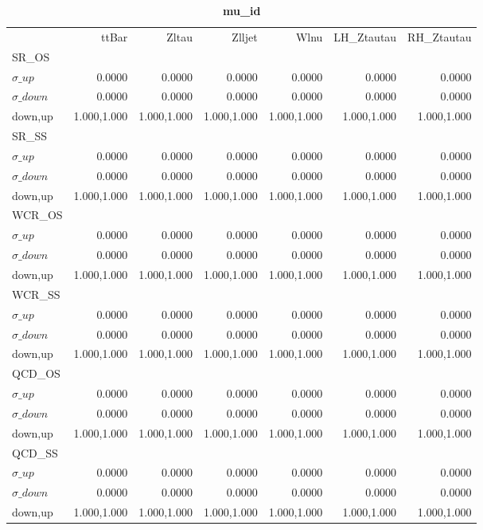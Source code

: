 \documentclass[11pt,oneside,a4paper]{article}
\begin{document}
\begin{table}
\centering
\caption{\bf{mu\_id}}
\begin{tabular}{lrrrrrr}
 & ttBar & Zltau & Zlljet & Wlnu & LH\_Ztautau & RH\_Ztautau \\
SR\_OS &  &  &  &  &  &  \\
$\sigma\_up$ & 0.0000 & 0.0000 & 0.0000 & 0.0000 & 0.0000 & 0.0000 \\
$\sigma\_down$ & 0.0000 & 0.0000 & 0.0000 & 0.0000 & 0.0000 & 0.0000 \\
down,up & 1.000,1.000 & 1.000,1.000 & 1.000,1.000 & 1.000,1.000 & 1.000,1.000 & 1.000,1.000 \\

\hline
SR\_SS &  &  &  &  &  &  \\
$\sigma\_up$ & 0.0000 & 0.0000 & 0.0000 & 0.0000 & 0.0000 & 0.0000 \\
$\sigma\_down$ & 0.0000 & 0.0000 & 0.0000 & 0.0000 & 0.0000 & 0.0000 \\
down,up & 1.000,1.000 & 1.000,1.000 & 1.000,1.000 & 1.000,1.000 & 1.000,1.000 & 1.000,1.000 \\

\hline
WCR\_OS &  &  &  &  &  &  \\
$\sigma\_up$ & 0.0000 & 0.0000 & 0.0000 & 0.0000 & 0.0000 & 0.0000 \\
$\sigma\_down$ & 0.0000 & 0.0000 & 0.0000 & 0.0000 & 0.0000 & 0.0000 \\
down,up & 1.000,1.000 & 1.000,1.000 & 1.000,1.000 & 1.000,1.000 & 1.000,1.000 & 1.000,1.000 \\

\hline
WCR\_SS &  &  &  &  &  &  \\
$\sigma\_up$ & 0.0000 & 0.0000 & 0.0000 & 0.0000 & 0.0000 & 0.0000 \\
$\sigma\_down$ & 0.0000 & 0.0000 & 0.0000 & 0.0000 & 0.0000 & 0.0000 \\
down,up & 1.000,1.000 & 1.000,1.000 & 1.000,1.000 & 1.000,1.000 & 1.000,1.000 & 1.000,1.000 \\

\hline
QCD\_OS &  &  &  &  &  &  \\
$\sigma\_up$ & 0.0000 & 0.0000 & 0.0000 & 0.0000 & 0.0000 & 0.0000 \\
$\sigma\_down$ & 0.0000 & 0.0000 & 0.0000 & 0.0000 & 0.0000 & 0.0000 \\
down,up & 1.000,1.000 & 1.000,1.000 & 1.000,1.000 & 1.000,1.000 & 1.000,1.000 & 1.000,1.000 \\

\hline
QCD\_SS &  &  &  &  &  &  \\
$\sigma\_up$ & 0.0000 & 0.0000 & 0.0000 & 0.0000 & 0.0000 & 0.0000 \\
$\sigma\_down$ & 0.0000 & 0.0000 & 0.0000 & 0.0000 & 0.0000 & 0.0000 \\
down,up & 1.000,1.000 & 1.000,1.000 & 1.000,1.000 & 1.000,1.000 & 1.000,1.000 & 1.000,1.000 \\

\hline
\end{tabular}
\end{table}
\end{document}
